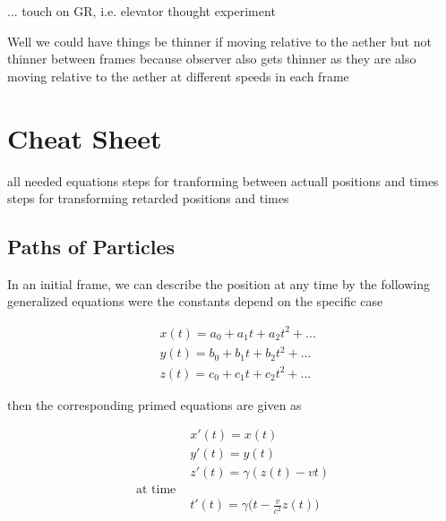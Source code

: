 ... touch on GR, i.e. elevator thought experiment

Well we could have things be thinner if moving relative to the aether but not thinner between frames because observer also gets thinner as they are also moving relative to the aether at different speeds in each frame

\chapter{Cheat Sheet} \label{ch: Cheat Sheet}

all needed equations
steps for tranforming between actuall positions and times
steps for transforming retarded positions and times

\section{Paths of Particles} \label{sect: Paths of Particles}

In an initial frame, we can describe the position at any time by the following generalized equations were the constants depend on the specific case

\begin{equation}
	\begin{aligned}
		 & x(t) = a_0 + a_1 t + a_2 t^2 + ... \\
		 & y(t) = b_0 + b_1 t + b_2 t^2 + ... \\
		 & z(t) = c_0 + c_1 t + c_2 t^2 + ...
	\end{aligned}
\end{equation}

then the corresponding primed equations are given as

\begin{equation}
	\begin{aligned}
		& {x{'}}(t) = x(t)                                         \\
		& {y{'}}(t) = y(t) \\
		& {z{'}}(t) = {\gamma} (z(t) - {v}{t})                       \\
	   \text{at time \ \ \ }                                   \\
		& {t{'}}(t) = {\gamma} \bigg(t-\frac{{v}}{{c}^2} z(t) \bigg)
   \end{aligned}
\end{equation}

